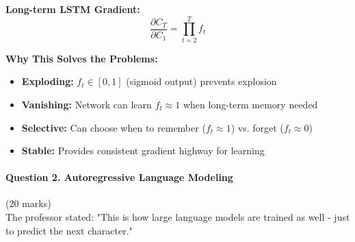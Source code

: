 \documentclass[12pt]{article}
\begin{document}
\begin{enumerate}[(a)]
{    \textbf{Long-term LSTM Gradient:}
    $$\frac{\partial C_T}{\partial C_1} = \prod_{t=2}^T f_t$$
    
    \textbf{Why This Solves the Problems:}
    \begin{itemize}
        \item \textbf{Exploding:} $f_t \in [0,1]$ (sigmoid output) prevents explosion
        \item \textbf{Vanishing:} Network can learn $f_t \approx 1$ when long-term memory needed
        \item \textbf{Selective:} Can choose when to remember ($f_t \approx 1$) vs. forget ($f_t \approx 0$)
        \item \textbf{Stable:} Provides consistent gradient highway for learning
    \end{itemize}
    }
\end{enumerate}

\newpage
\paragraph{Question 2. Autoregressive Language Modeling}\hfill (20 marks)\\
The professor stated: "This is how large language models are trained as well - just to predict the next character."
\end{document}
